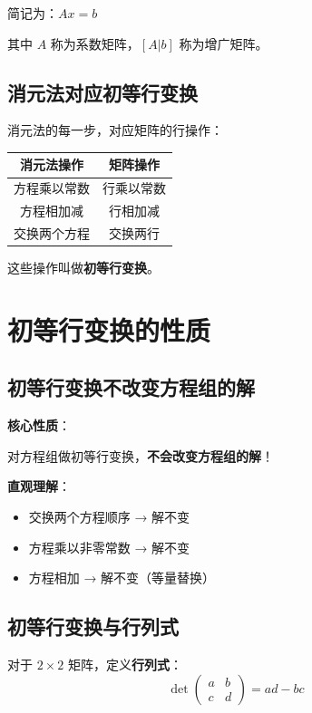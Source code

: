\documentclass[12pt,a4paper]{article}
\begin{document}
简记为：$Ax = b$

其中 $A$ 称为系数矩阵，$[A|b]$ 称为增广矩阵。

\subsection{消元法对应初等行变换}

消元法的每一步，对应矩阵的行操作：

\begin{center}
\begin{tabular}{|c|c|}
\hline
消元法操作 & 矩阵操作 \\
\hline
方程乘以常数 & 行乘以常数 \\
\hline
方程相加减 & 行相加减 \\
\hline
交换两个方程 & 交换两行 \\
\hline
\end{tabular}
\end{center}

这些操作叫做\textbf{初等行变换}。

\section{初等行变换的性质}

\subsection{初等行变换不改变方程组的解}

\textbf{核心性质}：

对方程组做初等行变换，\textbf{不会改变方程组的解}！

\textbf{直观理解}：
\begin{itemize}
    \item 交换两个方程顺序 → 解不变
    \item 方程乘以非零常数 → 解不变
    \item 方程相加 → 解不变（等量替换）
\end{itemize}

\subsection{初等行变换与行列式}

对于 $2 \times 2$ 矩阵，定义\textbf{行列式}：
\[
\det\begin{pmatrix} a & b \\ c & d \end{pmatrix} = ad - bc
\]
\end{document}
